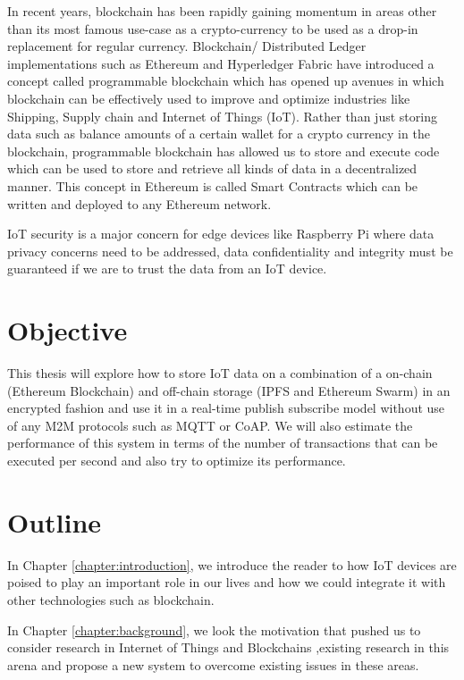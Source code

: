 \documentclass[11pt,openright]{report}
\begin{document}
In recent years, blockchain has been rapidly gaining momentum in areas other than its most famous use-case as a crypto-currency to be used as a drop-in replacement for regular currency. Blockchain/ Distributed Ledger implementations such as Ethereum and Hyperledger Fabric have introduced a concept called programmable blockchain which has opened up avenues in which blockchain can be effectively used to improve and optimize industries like Shipping, Supply chain and Internet of Things (IoT). Rather than just storing data such as balance amounts of a certain wallet for a crypto currency in the blockchain, programmable blockchain has allowed us to store and execute code which can be used to store and retrieve all kinds of data in a decentralized manner. This concept in Ethereum is called Smart Contracts which can be written and deployed to any Ethereum network.

IoT security is a major concern for edge devices like Raspberry Pi where data privacy concerns need to be addressed, data confidentiality and integrity must be guaranteed if we are to trust the data from an IoT device. 

\section{Objective}\label{section:objective}
This thesis will explore how to store IoT data on a combination of a on-chain (Ethereum Blockchain) and off-chain storage (IPFS and Ethereum Swarm) in an encrypted fashion and use it in a real-time publish subscribe model without use of any M2M protocols such as MQTT or CoAP. We will also estimate the performance of this system in terms of the number of transactions that can be executed per second and also try to optimize its performance.

\section{Outline}\label{section:outline}

In Chapter \ref{chapter:introduction}, we introduce the reader to how IoT devices are poised to play an important role in our lives and how we could integrate it with other technologies such as blockchain.\newline

\noindent In Chapter \ref{chapter:background}, we look the motivation that pushed us to consider research in Internet of Things and Blockchains ,existing research in this arena and propose a new system to overcome existing issues in these areas. \newline
\end{document}
